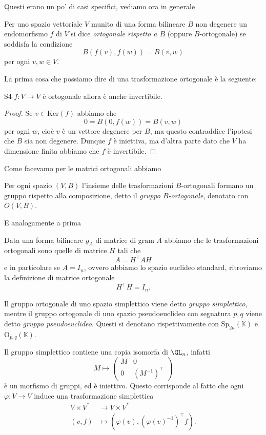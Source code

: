 \documentclass[11pt]{scrartcl}
\renewcommand{\ker}[1]{\text{Ker}\left(#1\right)}
\newcommand{\KK}{\mathbb{K}}
\begin{document}
	Questi erano un po' di casi specifici, vediamo ora in generale
	\begin{definition}
		Per uno spazio vettoriale $V$ munito di una forma bilineare $B$ non degenere un endomorfismo $f$ di $V$ si dice \textit{ortogonale rispetto a $B$} (oppure $B$-ortogonale) se soddisfa la condizione
		$$B\left(f(v),f(w)\right)=B(v,w)$$
		per ogni $v,w\in V$.
	\end{definition}
	La prima cosa che possiamo dire di una trasformazione ortogonale è la seguente:
	\begin{lemma}
		S4 $f:V\to V$ è ortogonale allora è anche invertibile.
	\end{lemma}
	\begin{proof}
		Se $v\in \ker{f}$ abbiamo che
		$$0=B(0,f(w))=B(v,w)$$
		per ogni $w$, cioè $v$ è un vettore degenere per $B$, ma questo contraddice l'ipotesi che $B$ sia non degenere. Dunque $f$ è iniettiva, ma d'altra parte dato che $V$ ha dimensione finita abbiamo che $f$ è invertibile.
	\end{proof}
	Come facevamo per le matrici ortogonali abbiamo
	\begin{definition}
		Per ogni spazio $(V,B)$ l'insieme delle trasformazioni $B$-ortogonali formano un gruppo rispetto alla composizione, detto il \textit{gruppo $B$-ortogonale}, denotato con $O(V,B)$.
	\end{definition}
	E analogamente a prima
	\begin{remark}
		Data una forma bilineare $g_A$ di matrice di gram $A$ abbiamo che le trasformazioni ortogonali sono quelle di matrice $H$ tali che
		$$A=H^\intercal A H$$
		e in particolare se $A=I_n$, ovvero abbiamo lo spazio euclideo standard, ritroviamo la definizione di matrice ortogonale
		$$H^\intercal H=I_n.$$ 
	\end{remark}
	\begin{definition}
		Il gruppo ortogonale di uno spazio simplettico viene detto \textit{gruppo simplettico}, mentre il gruppo ortogonale di uno spazio pseudoeuclideo con segnatura $p,q$ viene detto \textit{gruppo pseudoeuclideo}. Questi si denotano rispettivamente con $\text{Sp}_{2n}(\KK)$ e $\text{O}_{p,q}(\KK)$.
	\end{definition}
	\begin{remark}
		Il gruppo simplettico contiene una copia isomorfa di $\GL_n$, infatti
		$$M\mapsto \left(
		\begin{array}{c|c}
			M & 0 \\
			\hline
			0 & \left(M^{-1}\right)^\intercal
		\end{array}
		\right)$$
		è un morfismo di gruppi, ed è iniettivo. Questo corrisponde al fatto che ogni $\varphi:V\to V$ induce una trasformazione simplettica 
		\begin{align*}
			V\times V^* & \to V\times V^* \\
			(v,f) & \mapsto \left(\varphi(v),(\varphi(v)^{-1})^\intercal f\right).
		\end{align*}
	\end{remark}
	
\end{document}
